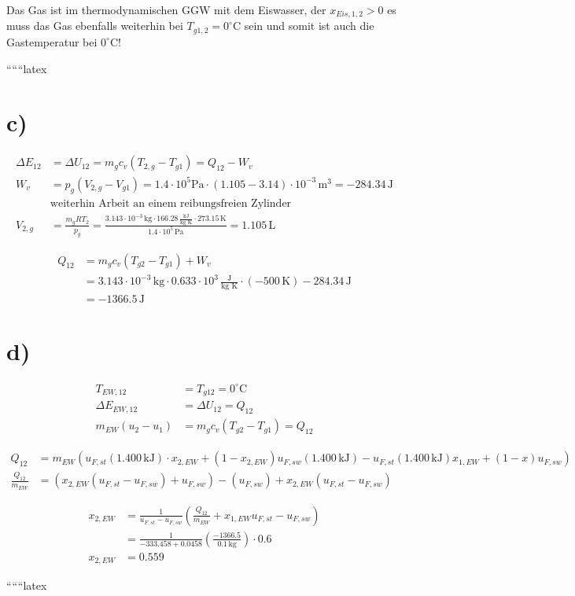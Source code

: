 Das Gas ist im thermodynamischen GGW mit dem Eiswasser, der $x_{Eis,1,2} > 0$ es muss das Gas ebenfalls weiterhin bei $T_{g1,2} = 0^\circ \text{C}$ sein und somit ist auch die Gastemperatur bei $0^\circ \text{C}$!

``````latex

\section*{c)}

\begin{align*}
\Delta E_{12} &= \Delta U_{12} = m_g c_v (T_{2,g} - T_{g1}) = Q_{12} - W_v \\
W_v &= p_{g} (V_{2,g} - V_{g1}) = 1.4 \cdot 10^5 \text{Pa} \cdot (1.105 - 3.14) \cdot 10^{-3} \, \text{m}^3 = -284.34 \, \text{J} \\
&\text{weiterhin Arbeit an einem reibungsfreien Zylinder} \\
V_{2,g} &= \frac{m_g R T_2}{p_{g}} = \frac{3.143 \cdot 10^{-3} \, \text{kg} \cdot 166.28 \, \frac{\text{kJ}}{\text{kg K}} \cdot 273.15 \, \text{K}}{1.4 \cdot 10^5 \, \text{Pa}} = 1.105 \, \text{L}
\end{align*}

\begin{align*}
Q_{12} &= m_g c_v (T_{g2} - T_{g1}) + W_v \\
&= 3.143 \cdot 10^{-3} \, \text{kg} \cdot 0.633 \cdot 10^3 \, \frac{\text{J}}{\text{kg K}} \cdot (-500 \, \text{K}) - 284.34 \, \text{J} \\
&= -1366.5 \, \text{J}
\end{align*}

\section*{d)}

\begin{align*}
T_{EW,12} &= T_{g12} = 0^\circ \text{C} \\
\Delta E_{EW,12} &= \Delta U_{12} = Q_{12} \\
m_{EW} (u_2 - u_1) &= m_g c_v (T_{g2} - T_{g1}) = Q_{12}
\end{align*}

\begin{align*}
Q_{12} &= m_{EW} \left( u_{F,st} (1.400 \, \text{kJ}) \cdot x_{2,EW} + (1 - x_{2,EW}) u_{F,sw} (1.400 \, \text{kJ}) - u_{F,st} (1.400 \, \text{kJ}) x_{1,EW} + (1 - x) u_{F,sw} \right) \\
\frac{Q_{12}}{m_{EW}} &= \left( x_{2,EW} (u_{F,st} - u_{F,sw}) + u_{F,sw} \right) - (u_{F,sw}) + x_{2,EW} (u_{F,st} - u_{F,sw})
\end{align*}

\begin{align*}
x_{2,EW} &= \frac{1}{u_{F,st} - u_{F,sw}} \left( \frac{Q_{12}}{m_{EW}} + x_{1,EW} u_{F,st} - u_{F,sw} \right) \\
&= \frac{1}{-333.458 + 0.0458} \left( \frac{-1366.5}{0.1 \, \text{kg}} \right) \cdot 0.6 \\
x_{2,EW} &= 0.559
\end{align*}

``````latex


